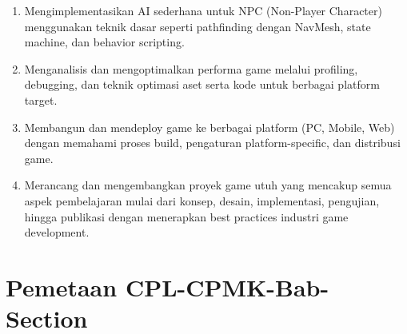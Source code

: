 \begin{enumerate}[label=CPMK\arabic*:]
\item Mengimplementasikan AI sederhana untuk NPC (Non-Player Character) menggunakan teknik dasar seperti pathfinding dengan NavMesh, state machine, dan behavior scripting.

\item Menganalisis dan mengoptimalkan performa game melalui profiling, debugging, dan teknik optimasi aset serta kode untuk berbagai platform target.

\item Membangun dan mendeploy game ke berbagai platform (PC, Mobile, Web) dengan memahami proses build, pengaturan platform-specific, dan distribusi game.

\item Merancang dan mengembangkan proyek game utuh yang mencakup semua aspek pembelajaran mulai dari konsep, desain, implementasi, pengujian, hingga publikasi dengan menerapkan best practices industri game development.
\end{enumerate}

\section{Pemetaan CPL-CPMK-Bab-Section}

